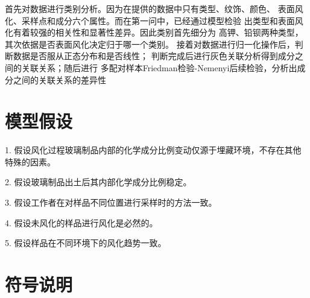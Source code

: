 \documentclass[UTF8]{ctexart}
\begin{document}
            首先对数据进行类别分析。因为在提供的数据中只有类型、纹饰、颜色、
            表面风化、采样点和成分六个属性。而在第一问中，已经通过模型检验
            出类型和表面风化有着较强的相关性和显著性差异。因此类别首先细分为
            高钾、铅钡两种类型，其次依据是否表面风化决定归于哪一个类别。
            接着对数据进行归一化操作后，判断数据是否服从正态分布和是否线性；
            判断完成后进行灰色关联分析得到成分之间的关联关系；随后进行
            多配对样本Friedman检验-Nemenyi后续检验，分析出成分之间的关联关系的差异性

            \section{模型假设}

            1. 假设风化过程玻璃制品内部的化学成分比例变动仅源于埋藏环境，不存在其他特殊的因素。

            2. 假设玻璃制品出土后其内部化学成分比例稳定。

            3. 假设工作者在对样品不同位置进行采样时的方法一致。

            4. 假设未风化的样品进行风化是必然的。

            5. 假设样品在不同环境下的风化趋势一致。


            \section{符号说明}
\end{document}
